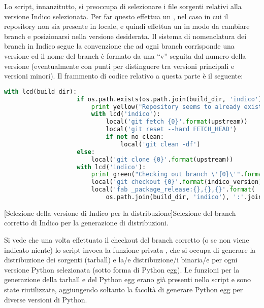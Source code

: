         Lo script, innanzitutto, si preoccupa di selezionare i file sorgenti relativi alla versione Indico selezionata. Per far questo effettua un , nel caso in cui il repository non sia presente in locale, e quindi effettua un  in modo da cambiare branch e posizionarsi nella versione desiderata. Il sistema di nomenclatura dei branch in Indico segue la convenzione che ad ogni branch corrisponde una versione ed il nome del branch è formato da una ``v'' seguita dal numero della versione (eventualmente con punti per distinguere tra versioni principali e versioni minori). Il frammento di codice relativo a questa parte è il seguente:
        
        \begin{center}
            \begin{lstlisting}[language=python, gobble=14]
                with lcd(build_dir):
                    if os.path.exists(os.path.join(build_dir, 'indico')):
                        print yellow("Repository seems to already exist.")
                        with lcd('indico'):
                            local('git fetch {0}'.format(upstream))
                            local('git reset --hard FETCH_HEAD')
                            if not no_clean:
                                local('git clean -df')
                    else:
                        local('git clone {0}'.format(upstream))
                    with lcd('indico'):
                        print green("Checking out branch \'{0}\'".format(indico_version))
                        local('git checkout {0}'.format(indico_version))
                        local('fab _package_release:{},{},{}'.format(
                            os.path.join(build_dir, 'indico'), ':'.join(py_versions), str(system_node).lower()))
            \end{lstlisting}
            \captionsetup{textformat=empty,labelformat=empty} \vspace{-2em}
            [Selezione della versione di Indico per la distribuzione]{Selezione del branch corretto di Indico per la generazione di distribuzioni.}
        \end{center}
        
        Si vede che una volta effettuato il checkout del branch corretto (o  se non viene indicato niente) lo script invoca la funzione privata , che si occupa di generare la distribuzione dei sorgenti (tarball) e la/e distribuzione/i binaria/e per ogni versione Python selezionata (sotto forma di Python egg). Le funzioni per la generazione della tarball e del Python egg erano già presenti nello script e sono state riutilizzate, aggiungendo soltanto la facoltà di generare Python egg per diverse versioni di Python.
        
